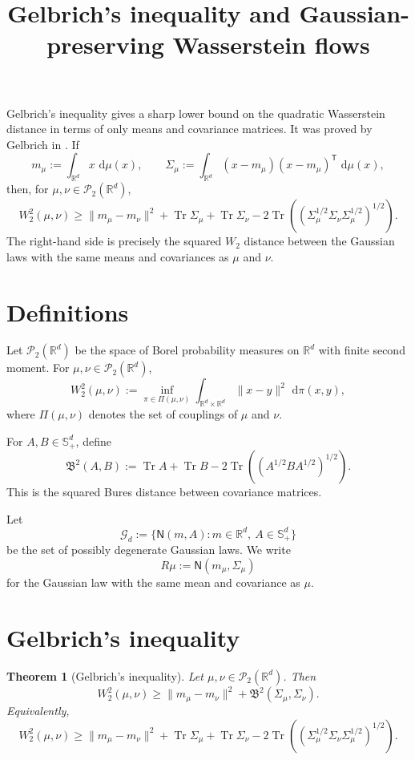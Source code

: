 \documentclass[11pt]{article}
\title{Gelbrich's inequality and Gaussian-preserving Wasserstein flows}
\author{}
\date{}
\newtheorem{theorem}{Theorem}
\DeclareMathOperator{\Tr}{Tr}
\newcommand{\R}{\mathbb R}
\newcommand{\W}{W}
\newcommand{\N}{\mathsf N}
\newcommand{\dd}{\,\mathrm d}
\begin{document}
\maketitle

Gelbrich's inequality gives a sharp lower bound on the quadratic Wasserstein distance in terms of only means and covariance matrices. It was proved by Gelbrich in \cite{Gelbrich1990}. If
\[
m_\mu:=\int_{\R^d}x\,\dd\mu(x),
\qquad
\Sigma_\mu:=\int_{\R^d}(x-m_\mu)(x-m_\mu)^{\mathsf T}\,\dd\mu(x),
\]
then, for $\mu,\nu\in\mathcal P_2(\R^d)$,
\[
\W_2^2(\mu,\nu)
\ge
\|m_\mu-m_\nu\|^2
+
\Tr \Sigma_\mu+\Tr \Sigma_\nu
-
2\Tr\!\left((\Sigma_\mu^{1/2}\Sigma_\nu\Sigma_\mu^{1/2})^{1/2}\right).
\]
The right-hand side is precisely the squared $\W_2$ distance between the Gaussian laws with the same means and covariances as $\mu$ and $\nu$.

\section{Definitions}

Let $\mathcal P_2(\R^d)$ be the space of Borel probability measures on $\R^d$ with finite second moment. For $\mu,\nu\in\mathcal P_2(\R^d)$,
\[
\W_2^2(\mu,\nu)
:=
\inf_{\pi\in\Pi(\mu,\nu)}
\int_{\R^d\times\R^d}\|x-y\|^2\,\dd\pi(x,y),
\]
where $\Pi(\mu,\nu)$ denotes the set of couplings of $\mu$ and $\nu$.

For $A,B\in\mathbb S_+^d$, define
\[
\mathfrak B^2(A,B)
:=
\Tr A+\Tr B
-
2\Tr\!\left((A^{1/2}BA^{1/2})^{1/2}\right).
\]
This is the squared Bures distance between covariance matrices.

Let
\[
\mathcal G_d:=\{\N(m,A):m\in\R^d,\ A\in\mathbb S_+^d\}
\]
be the set of possibly degenerate Gaussian laws. We write
\[
R\mu:=\N(m_\mu,\Sigma_\mu)
\]
for the Gaussian law with the same mean and covariance as $\mu$.

\section{Gelbrich's inequality}

\begin{theorem}[Gelbrich's inequality]
Let $\mu,\nu\in\mathcal P_2(\R^d)$. Then
\[
\W_2^2(\mu,\nu)
\ge
\|m_\mu-m_\nu\|^2+\mathfrak B^2(\Sigma_\mu,\Sigma_\nu).
\]
Equivalently,
\[
\W_2^2(\mu,\nu)
\ge
\|m_\mu-m_\nu\|^2
+
\Tr \Sigma_\mu+\Tr \Sigma_\nu
-
2\Tr\!\left((\Sigma_\mu^{1/2}\Sigma_\nu\Sigma_\mu^{1/2})^{1/2}\right).
\]
\end{theorem}
\end{document}
